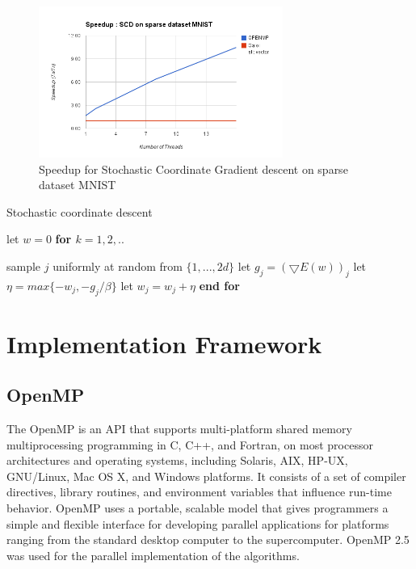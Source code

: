 \documentclass{sigplanconf}
\newlength\myindent
\newcommand\bindent{
  \begingroup
  \setlength{\itemindent}{\myindent}
  \addtolength{\algorithmicindent}{\myindent}
}
\newcommand\eindent{\endgroup}
\begin{document}
\begin{figure}[ht!]
\centering
\includegraphics[width=80mm]{scd_speed_sparse.png}
\caption{Speedup for Stochastic Coordinate Gradient descent on sparse dataset MNIST }
\label{overflow}
\end{figure}





\begin{algorithm}
\caption{Stochastic coordinate descent}
\begin{algorithmic} 
\STATE let $w = 0$
\STATE \bf{for} \begin{math} k = 1,2,.. \end{math}
    \bindent
	\STATE \textnormal{sample \begin{math}j\end{math} uniformly at random from \begin{math}\{1,...,2d\}\end{math}}
	\STATE \textnormal{let \begin{math}g_j = (\bigtriangledown{E(w)})_j\end{math}}
	\STATE \textnormal{let \begin{math}\eta = max\{ -w_j, -g_j/\beta \}\end{math}}
	\STATE \textnormal{let \begin{math}w_j = w_j + \eta\end{math}}
    \eindent
\STATE \bf{end for}
\end{algorithmic}
\end{algorithm}

\section{Implementation Framework}
\subsection{OpenMP}
The OpenMP \cite{openmp} is an API that supports multi-platform shared memory multiprocessing programming in C, C++, and Fortran, on most processor architectures and operating systems, including Solaris, AIX, HP-UX, GNU/Linux, Mac OS X, and Windows platforms. It consists of a set of compiler directives, library routines, and environment variables that influence run-time behavior. OpenMP uses a portable, scalable model that gives programmers a simple and flexible interface for developing parallel applications for platforms ranging from the standard desktop computer to the supercomputer. OpenMP 2.5 was used for the parallel
implementation of the algorithms.
\end{document}

